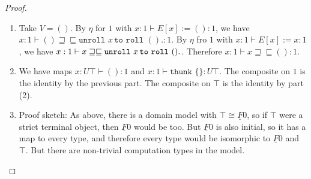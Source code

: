 \documentclass[acmsmall,nonacm]{acmart}
\renewcommand{\u}{\underline}
\newcommand{\ltdyn}{\sqsubseteq}
\newcommand{\gtdyn}{\sqsupseteq}
\newcommand{\equidyn}{\mathrel{\gtdyn\ltdyn}}
\newcommand{\roll}{\kw{roll}}
\newcommand{\kw}[1]{\texttt{#1}\,\,}
\newcommand{\pmmuXtoYinZ}[3]{\kw{unroll} #1 \,\kw{to} \roll #2. #3}
\newcommand{\thunk}{\kw{thunk}}
\begin{document}
\begin{longonly}
\begin{proof}
\begin{enumerate}
    \item Take $V = ()$.  By $\eta$ for $1$ with $x : 1 \vdash E[x] :=
      () : 1$, we have $x : 1 \vdash () \equidyn \pmmuXtoYinZ{x}{()} :
      1$.  By $\eta$ fro $1$ with $x : 1 \vdash E[x] := x : 1$, we have
      $x : 1 \vdash x \equidyn \pmmuXtoYinZ{x}{()}$.  Therefore $x : 1
      \vdash x \equidyn () : 1$.

    \item We have maps $x : U \top \vdash () : 1$ and $x : 1 \vdash
      \thunk{\{\}} : U \top$.  The composite on $1$ is the identity by
      the previous part.  The composite on $\top$ is the identity by
      part (2).

    \item Proof sketch: As above, there is a domain model with
      $\top \cong \u F 0$, so if $\top$ were a strict terminal object,
      then $\u F 0$ would be too.  But $\u F 0$ is also initial, so it
      has a map to every type, and therefore every type would be
      isomorphic to $\u F 0$ and $\top$.  But there are non-trivial
      computation types in the model.  
    \end{enumerate}
  \end{proof}
\end{longonly}
\end{document}
